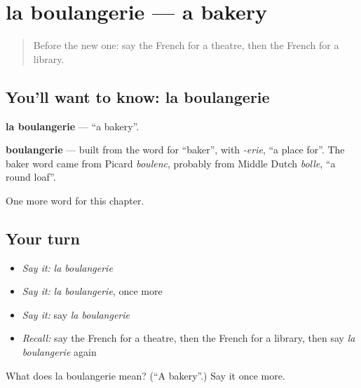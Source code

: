 \section[la boulangerie]{la boulangerie — a bakery}

\label{lesson:FR-C102-boulangerie}



\begin{quote}
Before the new one: say the French for a theatre, then the French for a library.
\end{quote}

\subsection*{You'll want to know: la boulangerie}
\textbf{la boulangerie} — \textquotedblleft{}a bakery\textquotedblright{}.

\begin{cousinweb}
\textbf{boulangerie} — built from the word for \textquotedblleft{}baker\textquotedblright{}, with \emph{-erie}, \textquotedblleft{}a place for\textquotedblright{}. The baker word came from Picard \emph{boulenc}, probably from Middle Dutch \emph{bolle}, \textquotedblleft{}a round loaf\textquotedblright{}.
\end{cousinweb}

\begin{grammarlens}[title={What you've built}]
One more word for this chapter.
\end{grammarlens}

\subsection*{Your turn}
\begin{itemize}
\raggedright
  \item \emph{Say it:} \emph{la boulangerie}
  \item \emph{Say it:} \emph{la boulangerie}, once more
  \item \emph{Say it:} say \emph{la boulangerie}
  \item \emph{Recall:} say the French for a theatre, then the French for a library, then say \emph{la boulangerie} again
\end{itemize}

\begin{tcolorbox}[breakable,colback=teal!4,colframe=teal!35!black,title={Before you move on}]
What does la boulangerie mean? (\textquotedblleft{}A bakery\textquotedblright{}.) Say it once more.
\end{tcolorbox}
